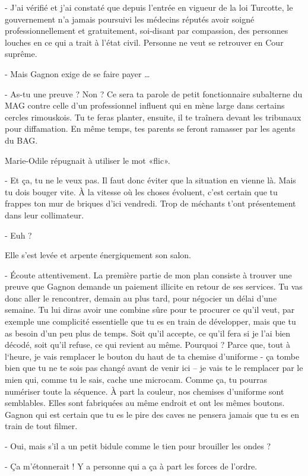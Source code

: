 - J’ai vérifié et j’ai constaté que depuis l’entrée en vigueur de la loi Turcotte, le gouvernement n’a jamais poursuivi les médecins réputés avoir soigné professionnellement et gratuitement, soi-disant par compassion, des personnes louches en ce qui a trait à l’état civil. Personne ne veut se retrouver en Cour suprême.

- Mais Gagnon exige de se faire payer …

- As-tu une preuve ? Non ? Ce sera ta parole de petit fonctionnaire subalterne du MAG contre celle d’un professionnel influent qui en mène large dans certains cercles rimouskois. Tu te feras planter, ensuite, il te traînera devant les tribunaux pour diffamation. En même temps, tes parents se feront ramasser par les agents du BAG.

Marie-Odile répugnait à utiliser le mot «flic».

- Et ça, tu ne le veux pas. Il faut donc éviter que la situation en vienne là. Mais tu dois bouger vite. À la vitesse où les choses évoluent, c’est certain que tu frappes ton mur de briques d’ici vendredi. Trop de méchants t’ont présentement dans leur collimateur.

- Euh ?

Elle s’est levée et arpente énergiquement son salon.

- Écoute attentivement. La première partie de mon plan consiste à trouver une preuve que Gagnon demande un paiement illicite en retour de ses services. Tu vas donc aller le rencontrer, demain au plus tard, pour négocier un délai d’une semaine. Tu lui diras avoir une combine sûre pour te procurer ce qu’il veut, par exemple une complicité essentielle que tu es en train de développer, mais que tu as besoin d’un peu plus de temps. Soit qu’il accepte, ce qu’il fera si je l’ai bien décodé, soit qu’il refuse, ce qui revient au même. Pourquoi ? Parce que, tout à l‘heure, je vais remplacer le bouton du haut de ta chemise d’uniforme - ça tombe bien que tu ne te sois pas changé avant de venir ici – je vais te le remplacer par le mien qui, comme tu le sais, cache une microcam. Comme ça, tu pourras numériser toute la séquence. À part la couleur, nos chemises d’uniforme sont semblables. Elles sont fabriquées au même endroit et ont les mêmes boutons. Gagnon qui est certain que tu es le pire des caves ne pensera jamais que tu es en train de tout filmer.

- Oui, mais s’il a un petit bidule comme le tien pour brouiller les ondes ?

- Ça m’étonnerait ! Y a personne qui a ça à part les forces de l’ordre.


